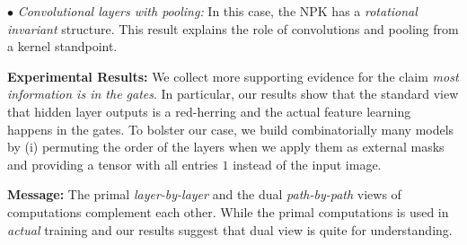 $\bullet$ \emph{Convolutional layers with pooling:} In this case, the NPK  has a  \emph{rotational invariant} structure. This result explains the role of convolutions and pooling from a kernel standpoint.

\textbf{Experimental Results:} We collect more supporting evidence for the claim \emph{most information is in the gates}. In particular, our results show that the standard view that hidden layer outputs is a red-herring and the actual feature learning happens in the gates. To bolster our case, we build combinatorially many models by (i) permuting the order of the layers when we apply them as external masks and providing a tensor with all entries $1$ instead of the input image. 

\textbf{Message:} The primal \emph{layer-by-layer} and the dual \emph{path-by-path} views of computations complement each other. While the primal computations is used in \emph{actual} training and our results suggest that dual view is quite for understanding. 

